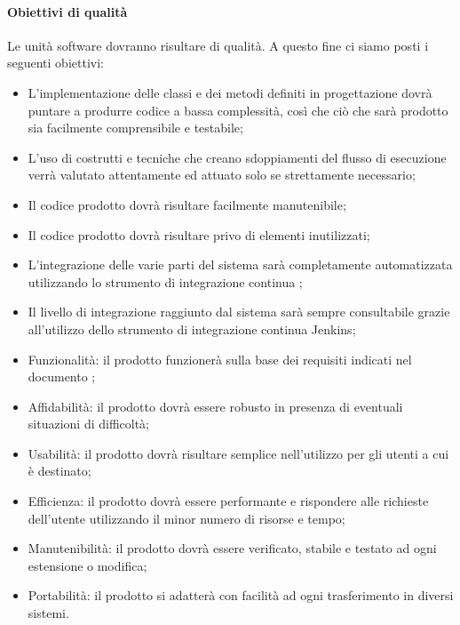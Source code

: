 \documentclass[../NormeDiProgetto_v4.0.0.tex]{subfiles}
\begin{document}
			\paragraph{Obiettivi di qualità}
			Le unità software dovranno risultare di qualità. A questo fine ci siamo posti i seguenti obiettivi:
			\begin{itemize}
				\item L'implementazione delle classi e dei metodi definiti in progettazione dovrà puntare a produrre codice a bassa complessità, così che ciò che sarà prodotto sia facilmente comprensibile e testabile;
				\item L'uso di costrutti e tecniche che creano sdoppiamenti del flusso di esecuzione verrà valutato attentamente ed attuato solo se strettamente necessario;
				\item Il codice prodotto dovrà risultare facilmente manutenibile;
				\item Il codice prodotto dovrà risultare privo di elementi inutilizzati;
				\item L'integrazione delle varie parti del sistema sarà completamente automatizzata utilizzando lo strumento di integrazione continua ;
				\item Il livello di integrazione raggiunto dal sistema sarà sempre consultabile grazie all'utilizzo dello strumento di integrazione continua Jenkins;
				\item Funzionalità: il prodotto funzionerà sulla base dei requisiti indicati nel documento \analisideirequisiti;
				\item Affidabilità: il prodotto dovrà essere robusto in presenza di eventuali situazioni di difficoltà;
				\item Usabilità: il prodotto dovrà risultare semplice nell'utilizzo per gli utenti a cui è destinato;
				\item Efficienza: il prodotto dovrà essere performante e rispondere alle richieste dell'utente utilizzando il minor numero di risorse e tempo;
				\item Manutenibilità: il prodotto dovrà essere verificato, stabile e testato ad ogni estensione o modifica;
				\item Portabilità: il prodotto si adatterà con facilità ad ogni trasferimento in diversi sistemi.
			\end{itemize}
\end{document}
